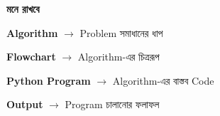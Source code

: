 \begin{rememberbox}

\textbf{\color{deepOrange}মনে রাখবে}

\begin{center}

\textbf{Algorithm}
\(\longrightarrow\)
Problem সমাধানের ধাপ

\medskip

\textbf{Flowchart}
\(\longrightarrow\)
Algorithm-এর চিত্ররূপ

\medskip

\textbf{Python Program}
\(\longrightarrow\)
Algorithm-এর বাস্তব Code

\medskip

\textbf{Output}
\(\longrightarrow\)
Program চালানোর ফলাফল

\end{center}

\end{rememberbox}

\small

